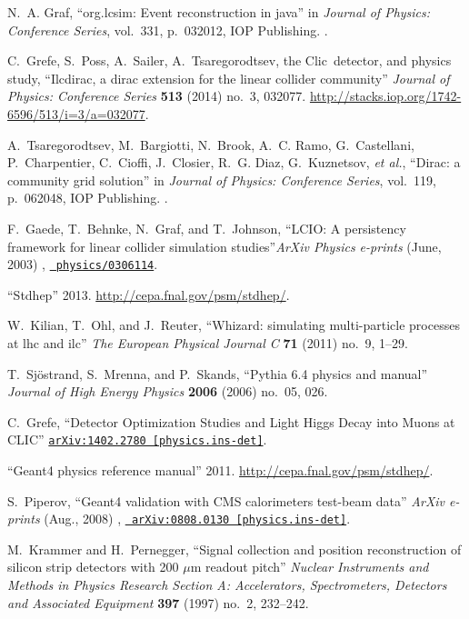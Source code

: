 \documentclass[12pt]{article}
\begin{document}
\begin{footnotesize}
\begin{thebibliography}{10}
N.~A. Graf, ``org.lcsim: Event reconstruction in java'' in {\em Journal of
  Physics: Conference Series}, vol.~331, p.~032012, IOP Publishing.
.

C.~Grefe, S.~Poss, A.~Sailer, A.~Tsaregorodtsev, the Clic~detector, and physics
  study, ``Ilcdirac, a dirac extension for the linear collider community'' {\em
  Journal of Physics: Conference Series} {\bf 513} (2014) no.~3, 032077.
  \url{http://stacks.iop.org/1742-6596/513/i=3/a=032077}.

A.~Tsaregorodtsev, M.~Bargiotti, N.~Brook, A.~C. Ramo, G.~Castellani,
  P.~Charpentier, C.~Cioffi, J.~Closier, R.~G. Diaz, G.~Kuznetsov, {\em et
  al.}, ``Dirac: a community grid solution'' in {\em Journal of Physics:
  Conference Series}, vol.~119, p.~062048, IOP Publishing.
.

F.~{Gaede}, T.~{Behnke}, N.~{Graf}, and T.~{Johnson}, ``{LCIO: A persistency
  framework for linear collider simulation studies}''{\em ArXiv Physics
  e-prints} (June, 2003)  , \href{http://arxiv.org/abs/physics/0306114}{{\tt
  physics/0306114}}.

``Stdhep'' 2013.
\newblock \url{http://cepa.fnal.gov/psm/stdhep/}.

W.~Kilian, T.~Ohl, and J.~Reuter, ``Whizard: simulating multi-particle
  processes at lhc and ilc'' {\em The European Physical Journal C} {\bf 71}
  (2011) no.~9, 1--29.

T.~Sj{\"o}strand, S.~Mrenna, and P.~Skands, ``Pythia 6.4 physics and manual''
  {\em Journal of High Energy Physics} {\bf 2006} (2006) no.~05, 026.

C.~Grefe, ``{Detector Optimization Studies and Light Higgs Decay into Muons at
  CLIC}''
\href{http://arxiv.org/abs/1402.2780}{{\tt arXiv:1402.2780 [physics.ins-det]}}.

``Geant4 physics reference manual'' 2011.
\newblock \url{http://cepa.fnal.gov/psm/stdhep/}.

S.~{Piperov}, ``{Geant4 validation with CMS calorimeters test-beam data}''{\em
  ArXiv e-prints} (Aug., 2008)  , \href{http://arxiv.org/abs/0808.0130}{{\tt
  arXiv:0808.0130 [physics.ins-det]}}.

M.~Krammer and H.~Pernegger, ``Signal collection and position reconstruction of
  silicon strip detectors with 200 $\mu$m readout pitch'' {\em Nuclear
  Instruments and Methods in Physics Research Section A: Accelerators,
  Spectrometers, Detectors and Associated Equipment} {\bf 397} (1997) no.~2,
  232--242.


\end{thebibliography}
\end{footnotesize}
\end{document}

